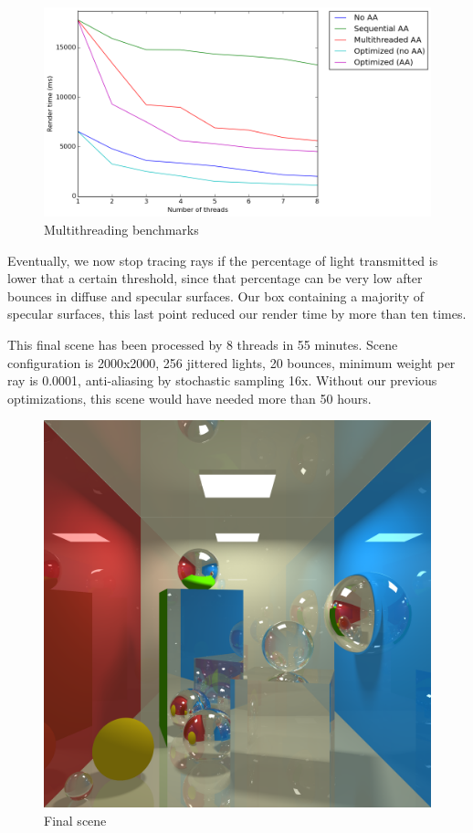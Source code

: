 \begin{figure}[H]
\centering
\includegraphics[width=0.8\linewidth]{img/benchmarksThreads.png}
\caption{Multithreading benchmarks}
\label{fig:threading}
\end{figure}
\pagebreak

Eventually, we now stop tracing rays if the percentage of light transmitted is lower that a certain threshold, since that percentage can be very low after bounces in diffuse and specular surfaces. Our box containing a majority of specular surfaces, this last point reduced our render time by more than ten times.

This final scene has been processed by 8 threads in 55 minutes. Scene configuration is 2000x2000, 256 jittered lights, 20 bounces, minimum weight per ray is 0.0001, anti-aliasing by stochastic sampling 16x. Without our previous optimizations, this scene would have needed more than 50 hours.

\begin{figure}[H]
\centering
\includegraphics[width=0.9\linewidth]{img/final.png}
\caption{Final scene}
\end{figure}
\pagebreak

